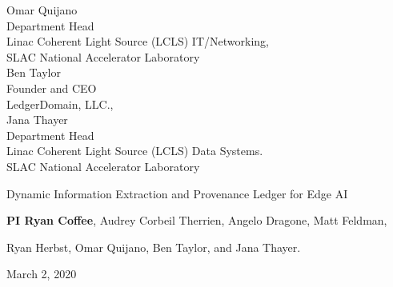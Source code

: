 \documentclass{article}
\begin{document}
\begin{centering}
	Omar Quijano\\
	Department Head\\
	Linac Coherent Light Source (LCLS) IT/Networking,\\
	SLAC National Accelerator Laboratory\\
	\vspace{.5\baselineskip}
	Ben Taylor\\
	Founder and CEO\\
	LedgerDomain, LLC.,\\
	\vspace{.5\baselineskip}
	Jana Thayer\\
	Department Head\\
	Linac Coherent Light Source (LCLS) Data Systems.\\
	SLAC National Accelerator Laboratory\\
\end{centering}
\thispagestyle{empty}
\break
\addtocounter{page}{-1}
\centerline{\large{Dynamic Information Extraction and Provenance Ledger for Edge AI}}
\normalsize
\vspace{0.5\baselineskip}
\centerline{\textbf{PI Ryan Coffee},
Audrey Corbeil Therrien,
Angelo Dragone,
Matt Feldman,}
\centerline{
Ryan Herbst,
Omar Quijano,
Ben Taylor, and 
Jana Thayer.
}
\centerline{March 2, 2020}
\vspace{0.5\baselineskip}
\end{document}
